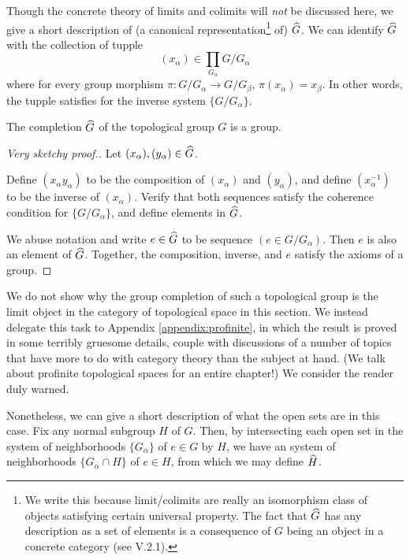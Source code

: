 Though the concrete theory of limits and colimits will \emph{not} 
be discussed here, we give a short description of (a canonical
representation\footnote{We write this because limit/colimits are
really an isomorphism class of objects satisfying certain universal
property. The fact that $\widehat{G}$ has any description as a set
of elements is a consequence of $G$ being an object in a concrete 
category (see \cite{ML} V.2.1).} of) $\widehat{G}$. We can 
identify $\widehat{G}$ with the collection of tupple 
\[
(x_\alpha) \in \prod_{G_\alpha} G/G_{\alpha}
\]
where for every group morphism $\pi : G/G_\alpha \to G/G_\beta$, 
$\pi(x_{\alpha}) = x_\beta$. In other words, the tupple satisfies
for the inverse system $\{G/G_\alpha\}$.

\begin{prop}\label{prop:group_compl_is_group}
The completion $\widehat{G}$ of the topological group $G$ is a 
group.
\end{prop}
\begin{proof}[Very sketchy proof.]
Let $(x_\alpha), (y_\alpha) \in \widehat{G}$.

Define $(x_\alpha y_\alpha)$ to be the composition of $(x_\alpha)$ 
and $(y_\alpha)$, and define $(x_\alpha^{-1})$ to be the inverse
of $(x_\alpha)$. Verify that both sequences satisfy the coherence
condition for $\{G/G_\alpha\}$, and define elements in 
$\widehat{G}$.

We abuse notation and write $e \in \widehat{G}$ to be sequence 
$(e \in G/G_\alpha)$. Then $e$ is also an element of $\widehat{G}$.
Together, the composition, inverse, and $e$ satisfy the axioms of
a group.
\end{proof}

We do not show why the group completion of such a topological 
group is the limit object in the category of topological space in
this section. We instead delegate this task to Appendix 
\ref{appendix:profinite}, in which the result is proved in some 
terribly gruesome details, couple with discussions of a number of
topics that have more to do with category theory than the subject
at hand. (We talk about profinite topological spaces for an entire 
chapter!) We consider the reader duly warned.

Nonetheless, we can give a short description of what the open sets
are in this case. Fix any normal subgroup $H$ of $G$. Then, by 
intersecting each open set in the system of neighborhoods 
$\{G_\alpha\}$ of $e \in G$ by $H$, we have an system of 
neighborhoods $\{G_\alpha \cap H\}$ of $e \in H$, from which we 
may define $\widehat{H}$.

